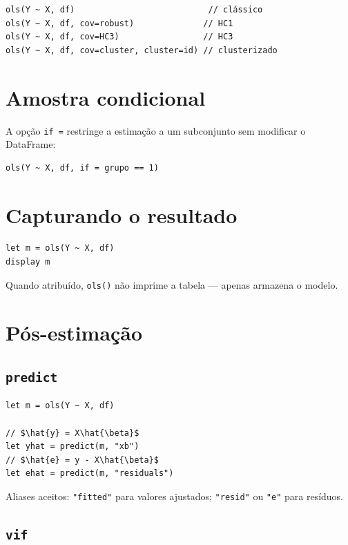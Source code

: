 \begin{lstlisting}[caption={Variantes de erro padrão}]
ols(Y ~ X, df)                           // clássico
ols(Y ~ X, df, cov=robust)              // HC1
ols(Y ~ X, df, cov=HC3)                 // HC3
ols(Y ~ X, df, cov=cluster, cluster=id) // clusterizado
\end{lstlisting}

\section{Amostra condicional}

A opção \lstinline{if =} restringe a estimação a um subconjunto sem modificar o DataFrame:

\begin{lstlisting}
ols(Y ~ X, df, if = grupo == 1)
\end{lstlisting}

\section{Capturando o resultado}

\begin{lstlisting}
let m = ols(Y ~ X, df)
display m
\end{lstlisting}

Quando atribuído, \lstinline{ols()} não imprime a tabela — apenas armazena o modelo.

\section{Pós-estimação}

\subsection{\texttt{predict}}

\begin{lstlisting}
let m = ols(Y ~ X, df)

// $\hat{y} = X\hat{\beta}$
let yhat = predict(m, "xb")
// $\hat{e} = y - X\hat{\beta}$
let ehat = predict(m, "residuals")
\end{lstlisting}

Aliases aceitos: \texttt{"fitted"} para valores ajustados; \texttt{"resid"} ou \texttt{"e"} para resíduos.

\subsection{\texttt{vif}}

